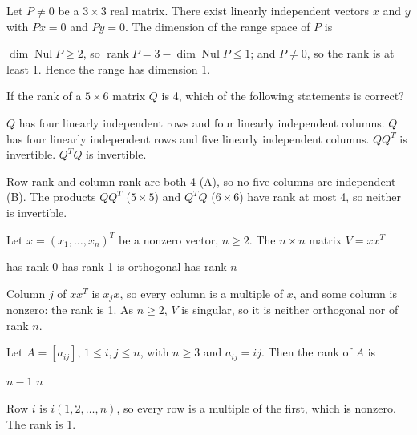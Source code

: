 \begin{question}[id=gate-in2009-1, source=GATE IN 2009, marks=2]
Let $P \ne 0$ be a $3 \times 3$ real matrix. There exist linearly independent vectors $x$ and $y$ with $Px = 0$ and $Py = 0$. The dimension of the range space of $P$ is
\begin{options}
\end{options}
\begin{solution}
$\dim \operatorname{Nul} P \ge 2$, so $\operatorname{rank} P = 3 - \dim \operatorname{Nul} P \le 1$; and $P \ne 0$, so the rank is at least 1. Hence the range has dimension 1.
\end{solution}
\end{question}

\begin{question}[id=gate-ee2008-1, source=GATE EE 2008]
If the rank of a $5 \times 6$ matrix $Q$ is 4, which of the following statements is correct?
\begin{options}
  \correct $Q$ has four linearly independent rows and four linearly independent columns.
  \option $Q$ has four linearly independent rows and five linearly independent columns.
  \option $QQ^T$ is invertible.
  \option $Q^TQ$ is invertible.
\end{options}
\begin{solution}
Row rank and column rank are both 4 (A), so no five columns are independent (B). The products $QQ^T$ ($5 \times 5$) and $Q^TQ$ ($6 \times 6$) have rank at most 4, so neither is invertible.
\end{solution}
\end{question}

\begin{question}[id=gate-ee2007-1, source=GATE EE 2007]
Let $x = (x_1, \dots, x_n)^T$ be a nonzero vector, $n \ge 2$. The $n \times n$ matrix $V = xx^T$
\begin{options}
  \option has rank 0
  \correct has rank 1
  \option is orthogonal
  \option has rank $n$
\end{options}
\begin{solution}
Column $j$ of $xx^T$ is $x_j x$, so every column is a multiple of $x$, and some column is nonzero: the rank is 1. As $n \ge 2$, $V$ is singular, so it is neither orthogonal nor of rank $n$.
\end{solution}
\end{question}

\begin{question}[id=gate-in2007-2, source=GATE IN 2007]
Let $A = [a_{ij}]$, $1 \le i, j \le n$, with $n \ge 3$ and $a_{ij} = ij$. Then the rank of $A$ is
\begin{options}
  \option $n - 1$
  \option $n$
\end{options}
\begin{solution}
Row $i$ is $i(1, 2, \dots, n)$, so every row is a multiple of the first, which is nonzero. The rank is 1.
\end{solution}
\end{question}

